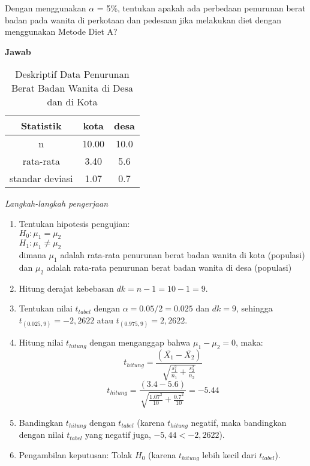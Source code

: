 \documentclass[
]{book}
\providecommand{\tightlist}{%
  \setlength{\itemsep}{0pt}\setlength{\parskip}{0pt}}
\begin{document}
Dengan menggunakan \(\alpha\) = 5\%, tentukan apakah ada perbedaan penurunan berat badan pada wanita di perkotaan dan pedesaan jika melakukan diet dengan menggunakan Metode Diet A?

\textbf{Jawab}\\

\begin{table}

\caption{\label{tab:unnamed-chunk-10}Deskriptif Data Penurunan Berat Badan Wanita di Desa dan di Kota}
\centering
\begin{tabular}[t]{ccc}
\toprule
Statistik & kota & desa\\
\midrule
n & 10.00 & 10.0\\
rata-rata & 3.40 & 5.6\\
standar deviasi & 1.07 & 0.7\\
\bottomrule
\end{tabular}
\end{table}

\emph{Langkah-langkah pengerjaan}

\begin{enumerate}
\def\labelenumi{\arabic{enumi}.}
\tightlist
\item
  Tentukan hipotesis pengujian:\\
  \(H_0 : \mu_1 = \mu_2\)\\
  \(H_1 : \mu_1 \neq \mu_2\)\\
  dimana \(\mu_1\) adalah rata-rata penurunan berat badan wanita di kota (populasi) dan \(\mu_2\) adalah rata-rata penurunan berat badan wanita di desa (populasi)
\item
  Hitung derajat kebebasan \(dk = n - 1 = 10 - 1 = 9\).
\item
  Tentukan nilai \(t_{tabel}\) dengan \(\alpha=0.05/2=0.025\) dan \(dk = 9\), sehingga \(t_{(0.025,9)} = -2,2622\) atau \(t_{(0.975,9)} = 2,2622\).
\item
  Hitung nilai \(t_{hitung}\) dengan menganggap bahwa \(\mu_1-\mu_2 = 0\), maka:\\
  \[
  t_{hitung} = \frac{(\bar{X_1}-\bar{X_2})}{\sqrt{\frac{s_1^2}{n_1}+\frac{s_2^2}{n_2}}}
  \]
  \[
  t_{hitung} = \frac{(3.4-5.6)}{\sqrt{\frac{1.07^2}{10}+\frac{0.7^2}{10}}} = -5.44
  \]
\item
  Bandingkan \(t_{hitung}\) dengan \(t_{tabel}\) (karena \(t_{hitung}\) negatif, maka bandingkan dengan nilai \(t_{tabel}\) yang negatif juga, \(-5,44<-2,2622\)).
\item
  Pengambilan keputusan: Tolak \(H_0\) (karena \(t_{hitung}\) lebih kecil dari \(t_{tabel}\)).
\end{enumerate}
\end{document}
